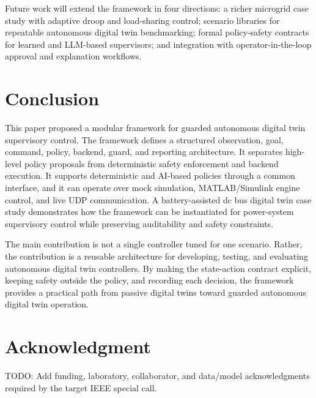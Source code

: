 \documentclass[conference]{IEEEtran}
\begin{document}
Future work will extend the framework in four directions: a richer microgrid
case study with adaptive droop and load-sharing control; scenario libraries
for repeatable autonomous digital twin benchmarking; formal policy-safety
contracts for learned and LLM-based supervisors; and integration with
operator-in-the-loop approval and explanation workflows.

\section{Conclusion}

This paper proposed a modular framework for guarded autonomous digital twin
supervisory control. The framework defines a structured observation, goal,
command, policy, backend, guard, and reporting architecture. It separates
high-level policy proposals from deterministic safety enforcement and backend
execution. It supports deterministic and AI-based policies through a common
interface, and it can operate over mock simulation, MATLAB/Simulink engine
control, and live UDP communication. A battery-assisted dc bus digital twin
case study demonstrates how the framework can be instantiated for power-system
supervisory control while preserving auditability and safety constraints.

The main contribution is not a single controller tuned for one scenario.
Rather, the contribution is a reusable architecture for developing, testing,
and evaluating autonomous digital twin controllers. By making the
state-action contract explicit, keeping safety outside the policy, and
recording each decision, the framework provides a practical path from passive
digital twins toward guarded autonomous digital twin operation.

\section*{Acknowledgment}

TODO: Add funding, laboratory, collaborator, and data/model acknowledgments
required by the target IEEE special call.
\end{document}
